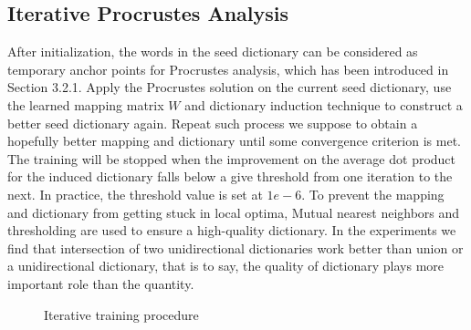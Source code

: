 \subsection{Iterative Procrustes Analysis}
After initialization, the words in the seed dictionary can be considered as temporary  anchor points for Procrustes analysis, which has been introduced in Section 3.2.1.
Apply the Procrustes solution on the current seed dictionary, use the learned mapping matrix $W$ and dictionary induction technique to construct a better seed dictionary again. Repeat such process we suppose to obtain a hopefully better mapping and dictionary until some convergence criterion is met. The training will be stopped when the improvement on the average dot product for the induced dictionary falls below a give threshold from one iteration to the next. In practice, the threshold value is set at $1e-6$.  To prevent the mapping and dictionary from getting stuck in local optima, Mutual nearest neighbors and thresholding are used to ensure a high-quality dictionary. In the experiments we find that intersection of two unidirectional dictionaries work better than union or a unidirectional dictionary,  that is to say, the quality of dictionary plays more important role than the quantity.\\
\begin{figure}[h]
	\centering
	\begin{minipage}{.7\linewidth}
		\begin{algorithm}[H]
			\SetAlgoLined
			\caption{Iterative training procedure}
		\end{algorithm}
	\end{minipage}
\end{figure}

